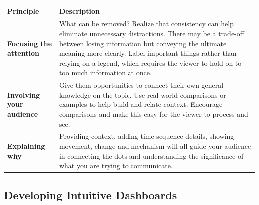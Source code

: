 \documentclass[]{book}
\begin{document}
\begin{longtable}[]{@{}ll@{}}
\toprule
\begin{minipage}[b]{0.19\columnwidth}\raggedright
\textbf{Principle}\strut
\end{minipage} & \begin{minipage}[b]{0.75\columnwidth}\raggedright
\textbf{Description}\strut
\end{minipage}\tabularnewline
\midrule
\endhead
\begin{minipage}[t]{0.19\columnwidth}\raggedright
\textbf{Focusing the attention}\strut
\end{minipage} & \begin{minipage}[t]{0.75\columnwidth}\raggedright
What can be removed? Realize that consistency can help eliminate unnecessary distractions. There may be a trade-off between losing information but conveying the ultimate meaning more clearly. Label important things rather than relying on a legend, which requires the viewer to hold on to too much information at once.\strut
\end{minipage}\tabularnewline
\begin{minipage}[t]{0.19\columnwidth}\raggedright
\textbf{Involving your audience}\strut
\end{minipage} & \begin{minipage}[t]{0.75\columnwidth}\raggedright
Give them opportunities to connect their own general knowledge on the topic. Use real world comparisons or examples to help build and relate context. Encourage comparisons and make this easy for the viewer to process and see.\strut
\end{minipage}\tabularnewline
\begin{minipage}[t]{0.19\columnwidth}\raggedright
\textbf{Explaining why}\strut
\end{minipage} & \begin{minipage}[t]{0.75\columnwidth}\raggedright
Providing context, adding time sequence details, showing movement, change and mechanism will all guide your audience in connecting the dots and understanding the significance of what you are trying to communicate.\strut
\end{minipage}\tabularnewline
\bottomrule
\end{longtable}

\hypertarget{developing-intuitive-dashboards}{%
\subsection{Developing Intuitive Dashboards}\label{developing-intuitive-dashboards}}
\end{document}
